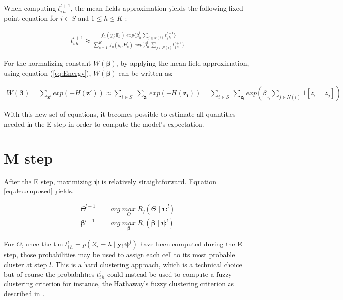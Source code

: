 When computing $t_{i\,h}^{l+1}$, the mean fields approximation yields the following fixed point equation for $i \in S$ and $1 \leq h \leq K$ \citep{Dang98}:

\begin{align}
\label{eq:fixedpoint}
t_{i\,h}^{l+1} \approx \frac{f_{h} (y_i;\boldsymbol{\theta}_{h}^l)\; exp\{\beta_h^l \: \sum_{j \in N(i)} t_{j\,h}^{l+1}\}}{\sum_{u=1}^K \: f_{u} (y_i;\boldsymbol{\theta}_{u}^l)\; exp\{\beta_u^l \: \sum_{j \in N(i)} t_{j\,u}^{l+1}\}}
\end{align}


For the normalizing constant $W(\boldsymbol{\beta})$, by applying the mean-field approximation, using equation (\ref{eq:Energy}), $W(\boldsymbol{\beta})$ can be written as:

\begin{align*}
W(\boldsymbol{\beta}) = \sum\limits_{\boldsymbol{z'}} exp(-H(\boldsymbol{z'})) \approx \sum\limits_{i \in S}\;\sum\limits_{\boldsymbol{z_i}} exp(-H(\boldsymbol{z_i})) = \sum\limits_{i \in S}\;\sum\limits_{\boldsymbol{z_i}} exp(\beta_{z_i}\sum\limits_{j \in N(i)}1[z_i=z_j])
\end{align*}

With this new set of equations, it becomes possible to estimate all quantities needed in the E step in order to compute the model's expectation.\\

\section{M step}
After the E step, maximizing $\boldsymbol{\psi}$ is relatively straightforward. Equation \ref{eq:decomposed} yields:

\begin{align*}
\Theta^{l+1} &= arg\:\underset{\Theta}{max}\:R_y(\Theta\mid \boldsymbol{\psi}^l)\\
\boldsymbol{\beta}^{l+1} &= arg\:\underset{\boldsymbol{\beta}}{max}\:R_z(\boldsymbol{\beta}\mid \boldsymbol{\psi}^l)
\end{align*}

For $\Theta$, once the the $t_{i\,h}^{l} = p(Z_i = h \mid \boldsymbol{y};\boldsymbol{\psi}^{l})$ have been computed during the E-step, those probabilities may be used to assign each cell to its most probable cluster at step $l$. This is a hard clustering approach, which is a technical choice but of course the probabilities $t_{i\,h}^{l}$ could instead be used to compute a fuzzy clustering criterion for instance, the Hathaway's fuzzy clustering criterion as described in \citep{Dang98}.\\
 
